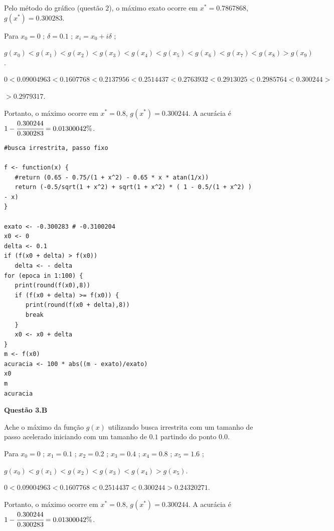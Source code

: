 \documentclass{rbfin}
\begin{document}
Pelo método do gráfico (questão $2$), o máximo exato ocorre em $x^* = 0.7867868$, $g(x^*) = 0.300283$.

Para $x_0 = 0$ ; $\delta = 0.1$ ; $x_i = x_0 + i\delta$ ;

$g(x_0) < g(x_1) < g(x_2) < g(x_3) < g(x_4) < g(x_5) < g(x_6) < g(x_7) < g(x_8) > g(x_9)$.

$0 < 0.09004963 < 0.1607768 < 0.2137956 < 0.2514437 < 0.2763932 < 0.2913025 < 0.2985764 < 0.300244 >$

$> 0.2979317$.

Portanto, o máximo ocorre em $x^* = 0.8$, $g(x^*) = 0.300244$. A acurácia é $1 - \cfrac{0.300244}{0.300283} = 0.01300042\%$.

\singlespacing

\begin{verbatim}
#busca irrestrita, passo fixo

f <- function(x) {
   #return (0.65 - 0.75/(1 + x^2) - 0.65 * x * atan(1/x))
   return (-0.5/sqrt(1 + x^2) + sqrt(1 + x^2) * ( 1 - 0.5/(1 + x^2) ) - x)
}

exato <- -0.300283 # -0.3100204 
x0 <- 0
delta <- 0.1
if (f(x0 + delta) > f(x0))
   delta <- - delta
for (epoca in 1:100) {
   print(round(f(x0),8))
   if (f(x0 + delta) >= f(x0)) {
      print(round(f(x0 + delta),8))
      break
   }
   x0 <- x0 + delta
}
m <- f(x0)
acuracia <- 100 * abs((m - exato)/exato)
x0
m
acuracia
\end{verbatim}

\vspace{6mm}

\large

\textbf{Questão 3.B}

\normalsize

\vspace{6mm}

\doublespacing

Ache o máximo da função $g(x)$ utilizando busca irrestrita com um tamanho de passo acelerado iniciando com um tamanho de $0.1$ partindo do ponto $0.0$.

Para $x_0 = 0$ ; $x_1 = 0.1$ ; $x_2 = 0.2$ ; $x_3 = 0.4$ ; $x_4 = 0.8$ ; $x_5 = 1.6$ ;

$g(x_0) < g(x_1) < g(x_2) < g(x_3) < g(x_4) > g(x_5)$.

$0 < 0.09004963 < 0.1607768 < 0.2514437 < 0.300244 > 0.24320271$.

Portanto, o máximo ocorre em $x^* = 0.8$, $g(x^*) = 0.300244$. A acurácia é $1 - \cfrac{0.300244}{0.300283} = 0.01300042\%$.
\end{document}
